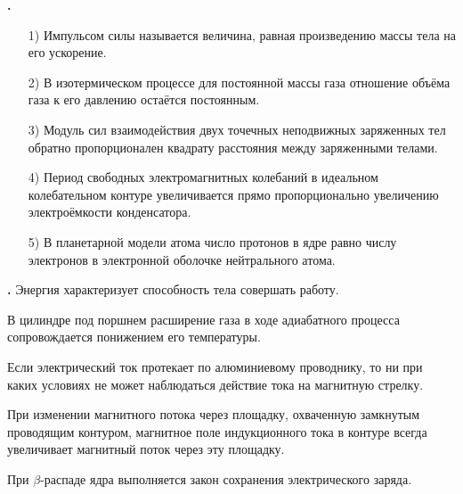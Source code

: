 \documentclass[12pt,a4paper]{article}
\newif\ifShowSolutions
\newcounter{banktask}
\newcommand{\BankTask}[3]{%
  \refstepcounter{banktask}%
  \Needspace{35mm}\par\medskip\noindent\begin{minipage}{\linewidth}%
  \noindent\textbf{\thebanktask.}\quad #2\par
  \ifShowSolutions
    #3\par
    \ifdefined\TutorEdition
      \ifcsname TutorSource#1\endcsname
        \smallskip{\small\csname TutorSource#1\endcsname\par}%
      \fi
    \fi
  \fi
  \end{minipage}\par\medskip
}
\begin{document}
\BankTask{368BED}{
\begin{enumerate}
\item[1)] Импульсом силы называется величина, равная произведению массы тела на его ускорение.
\item[2)] В изотермическом процессе для постоянной массы газа отношение объёма газа к его давлению остаётся постоянным.
\item[3)] Модуль сил взаимодействия двух точечных неподвижных заряженных тел обратно пропорционален квадрату расстояния между заряженными телами.
\item[4)] Период свободных электромагнитных колебаний в идеальном колебательном контуре увеличивается прямо пропорционально увеличению электроёмкости конденсатора.
\item[5)] В планетарной модели атома число протонов в ядре равно числу электронов в электронной оболочке нейтрального атома.
\end{enumerate}
}{
\smallskip\noindent\textbf{Решение от GPT}\par
1) Неверно: импульс постоянной силы равен $\vec F\Delta t$, а $m\vec a=\vec F$. 2) Неверно: при изотермическом процессе $pV=\mathrm{const}$. 3) Верно: по закону Кулона $F=k|q_1q_2|/r^2$. 4) Неверно: $T=2\pi\sqrt{LC}$, поэтому при постоянной индуктивности $T\propto\sqrt C$. 5) Верно: нейтральность атома означает равенство числа протонов и электронов; ответ: $35$.
}

\BankTask{AD5973}{
Энергия характеризует способность тела совершать работу.

В цилиндре под поршнем расширение газа в ходе адиабатного процесса сопровождается понижением его температуры.

Если электрический ток протекает по алюминиевому проводнику, то ни при каких условиях не может наблюдаться действие тока на магнитную стрелку.

При изменении магнитного потока через площадку, охваченную замкнутым проводящим контуром, магнитное поле индукционного тока в контуре всегда увеличивает магнитный поток через эту площадку.

При $\beta$-распаде ядра выполняется закон сохранения электрического заряда.
}{
\smallskip\noindent\textbf{Решение от GPT}\par
1) Верно: энергия характеризует способность тела совершать работу. 2) Верно: при адиабатном расширении $Q=0$, газ совершает положительную работу, поэтому $\Delta U=-A<0$ и температура понижается. 3) Неверно: ток в алюминиевом проводнике создаёт магнитное поле, которое может действовать на магнитную стрелку. 4) Неверно: по правилу Ленца индукционный ток противодействует изменению магнитного потока, поэтому его поле может как увеличивать, так и уменьшать поток. 5) Верно: при $\beta$-распаде суммарный электрический заряд сохраняется; ответ: $125$.
}
\end{document}
